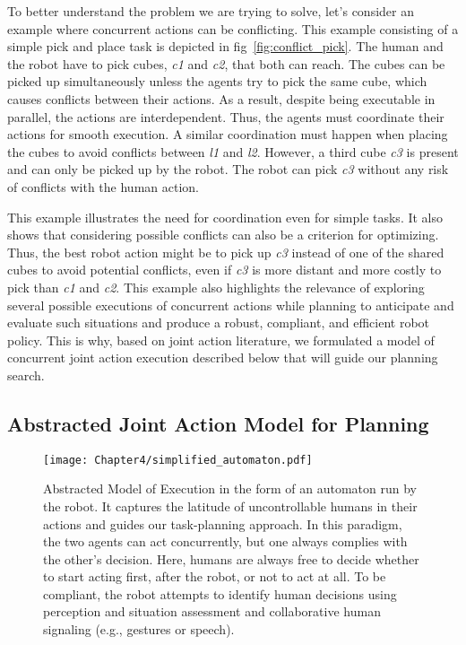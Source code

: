 To better understand the problem we are trying to solve, let's consider an example where concurrent actions can be conflicting. This example consisting of a simple pick and place task is depicted in fig~\ref{fig:conflict_pick}. The human and the robot have to pick cubes, \emph{c1} and \emph{c2}, that both can reach. 
The cubes can be picked up simultaneously unless the agents try to pick the same cube, which causes conflicts between their actions. As a result, despite being executable in parallel, the actions are interdependent. Thus, the agents must coordinate their actions for smooth execution.
A similar coordination must happen when placing the cubes to avoid conflicts between \emph{l1} and \emph{l2}.
However, a third cube \emph{c3} is present and can only be picked up by the robot. The robot can pick \emph{c3} without any risk of conflicts with the human action. 

This example illustrates the need for coordination even for simple tasks. It also shows that considering possible conflicts can also be a criterion for optimizing. Thus, the best robot action might be to pick up \emph{c3} instead of one of the shared cubes to avoid potential conflicts, even if \emph{c3} is more distant and more costly to pick than \emph{c1} and \emph{c2}.
This example also highlights the relevance of exploring several possible executions of concurrent actions while planning to anticipate and evaluate such situations and produce a robust, compliant, and efficient robot policy. This is why, based on joint action literature, we formulated a model of concurrent joint action execution described below that will guide our planning search.

\subsection{Abstracted Joint Action Model for Planning}

\begin{figure}[h]
    \centering
    \texttt{[image: Chapter4/simplified\_automaton.pdf]}
    \caption{
    Abstracted Model of Execution in the form of an automaton run by the robot. It captures the latitude of uncontrollable humans in their actions and guides our task-planning approach.
    In this paradigm, the two agents can act concurrently, but one always complies with the other's decision.
    Here, humans are always free to decide whether to start acting first, after the robot, or not to act at all.
    To be compliant, the robot attempts to identify human decisions using perception and situation assessment and collaborative human signaling (e.g., gestures or speech).
    }
    \label{fig:simplified_model_exec}
\end{figure}

